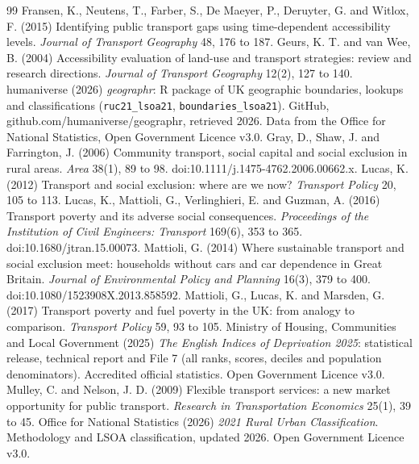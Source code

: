 \documentclass[11pt,a4paper]{article}
\begin{document}
\begin{thebibliography}{99}
 Fransen, K., Neutens, T., Farber, S., De Maeyer, P., Deruyter, G. and Witlox, F. (2015) Identifying public transport gaps using time-dependent accessibility levels. \textit{Journal of Transport Geography} 48, 176 to 187.
 Geurs, K. T. and van Wee, B. (2004) Accessibility evaluation of land-use and transport strategies: review and research directions. \textit{Journal of Transport Geography} 12(2), 127 to 140.
 humaniverse (2026) \textit{geographr}: R package of UK geographic boundaries, lookups and classifications (\texttt{ruc21\_lsoa21}, \texttt{boundaries\_lsoa21}). GitHub, github.com/humaniverse/geographr, retrieved 2026. Data from the Office for National Statistics, Open Government Licence v3.0.
 Gray, D., Shaw, J. and Farrington, J. (2006) Community transport, social capital and social exclusion in rural areas. \textit{Area} 38(1), 89 to 98. doi:10.1111/j.1475-4762.2006.00662.x.
 Lucas, K. (2012) Transport and social exclusion: where are we now? \textit{Transport Policy} 20, 105 to 113.
 Lucas, K., Mattioli, G., Verlinghieri, E. and Guzman, A. (2016) Transport poverty and its adverse social consequences. \textit{Proceedings of the Institution of Civil Engineers: Transport} 169(6), 353 to 365. doi:10.1680/jtran.15.00073.
 Mattioli, G. (2014) Where sustainable transport and social exclusion meet: households without cars and car dependence in Great Britain. \textit{Journal of Environmental Policy and Planning} 16(3), 379 to 400. doi:10.1080/1523908X.2013.858592.
 Mattioli, G., Lucas, K. and Marsden, G. (2017) Transport poverty and fuel poverty in the UK: from analogy to comparison. \textit{Transport Policy} 59, 93 to 105.
 Ministry of Housing, Communities and Local Government (2025) \textit{The English Indices of Deprivation 2025}: statistical release, technical report and File 7 (all ranks, scores, deciles and population denominators). Accredited official statistics. Open Government Licence v3.0.
 Mulley, C. and Nelson, J. D. (2009) Flexible transport services: a new market opportunity for public transport. \textit{Research in Transportation Economics} 25(1), 39 to 45.
 Office for National Statistics (2026) \textit{2021 Rural Urban Classification}. Methodology and LSOA classification, updated 2026. Open Government Licence v3.0.

\end{thebibliography}
\end{document}

